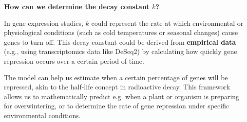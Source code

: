 \documentclass[11pt]{report}
\begin{document}
{\begin{multicols}{2}
	\textbf{How can we determine the decay constant \( k \)?} 
	
	In gene expression studies, \( k \) could represent the rate at which environmental or physiological conditions (such as cold temperatures or seasonal changes) cause genes to turn off. This decay constant could be derived from \textbf{empirical data} (e.g., using transcriptomics data like DeSeq2) by calculating how quickly gene repression occurs over a certain period of time.
	
	The model can help us estimate when a certain percentage of genes will be repressed, akin to the half-life concept in radioactive decay. This framework allows us to mathematically predict e.g. when a plant or organism is preparing for overwintering, or to determine the rate of gene repression under specific environmental conditions.
\end{multicols}	


\newpage	
}
\end{document}
